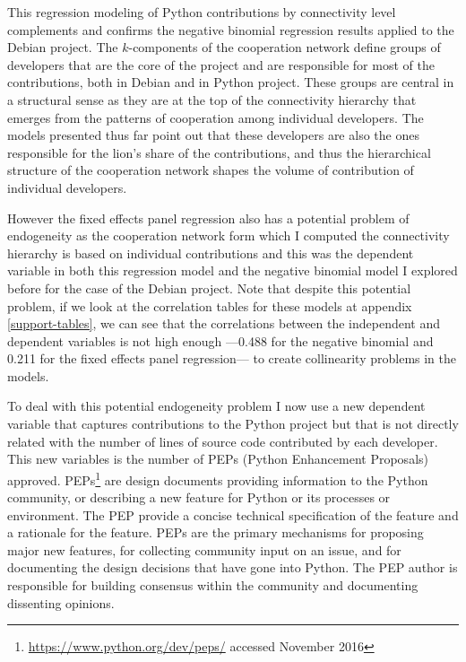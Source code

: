 

This regression modeling of Python contributions by connectivity level complements and confirms the negative binomial regression results applied to the Debian project. The $k$-components of the cooperation network define groups of developers that are the core of the project and are responsible for most of the contributions, both in Debian and in Python project. These groups are central in a structural sense as they are at the top of the connectivity hierarchy that emerges from the patterns of cooperation among individual developers. The models presented thus far point out that these developers are also the ones responsible for the lion's share of the contributions, and thus the hierarchical structure of the cooperation network shapes the volume of contribution of individual developers.

However the fixed effects panel regression also has a potential problem of endogeneity as the cooperation network form which I computed the connectivity hierarchy is based on individual contributions and this was the dependent variable in both this regression model and the negative binomial model I explored before for the case of the Debian project. Note that despite this potential problem, if we look at the correlation tables for these models at appendix \ref{support-tables}, we can see that the correlations between the independent and dependent variables is not high enough ---0.488 for the negative binomial and 0.211 for the fixed effects panel regression--- to create collinearity problems in the models.



To deal with this potential endogeneity problem I now use a new dependent variable that captures contributions to the Python project but that is not directly related with the number of lines of source code contributed by each developer. This new variables is the number of PEPs (Python Enhancement Proposals) approved. PEPs\footnote{\href{https://www.python.org/dev/peps/}{https://www.python.org/dev/peps/} accessed November 2016} are design documents providing information to the Python community, or describing a new feature for Python or its processes or environment. The PEP provide a concise technical specification of the feature and a rationale for the feature. PEPs are the primary mechanisms for proposing major new features, for collecting community input on an issue, and for documenting the design decisions that have gone into Python. The PEP author is responsible for building consensus within the community and documenting dissenting opinions.

